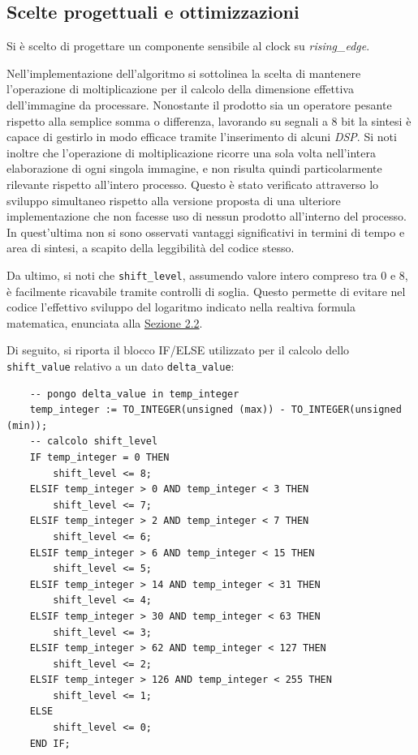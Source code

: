 \documentclass{article}
\begin{document}
\subsection{Scelte progettuali e ottimizzazioni} %
Si è scelto di progettare un componente sensibile al clock su \emph{rising\_edge}.\par
Nell’implementazione dell’algoritmo si sottolinea la scelta di mantenere l’operazione di moltiplicazione per il calcolo della dimensione effettiva dell’immagine da processare. Nonostante il prodotto sia un operatore pesante rispetto alla semplice somma o differenza, lavorando su segnali a 8 bit la sintesi è capace di gestirlo in modo efficace tramite l’inserimento di alcuni \emph{DSP}\footnotemark.
Si noti inoltre che l’operazione di moltiplicazione ricorre una sola volta nell’intera elaborazione di ogni singola immagine, e non risulta quindi particolarmente rilevante rispetto all’intero processo. Questo è stato verificato attraverso lo sviluppo simultaneo rispetto alla versione proposta di una ulteriore implementazione che non facesse uso di nessun prodotto all’interno del processo. In quest’ultima non si sono osservati vantaggi significativi in termini di tempo e area di sintesi, a scapito della leggibilità del codice stesso.\par
Da ultimo, si noti che \texttt{shift\_level}, assumendo valore intero compreso tra 0 e 8, è facilmente ricavabile tramite controlli di soglia. Questo permette di evitare nel codice l’effettivo sviluppo del logaritmo indicato nella realtiva formula matematica, enunciata alla \hyperref[sec:appr]{Sezione 2.2}.\par
Di seguito, si riporta il blocco IF/ELSE utilizzato per il calcolo dello \texttt{shift\_value} relativo a un dato \texttt{delta\_value}:

\begin{verbatim}
    -- pongo delta_value in temp_integer
    temp_integer := TO_INTEGER(unsigned (max)) - TO_INTEGER(unsigned (min)); 
    -- calcolo shift_level
    IF temp_integer = 0 THEN
        shift_level <= 8;
    ELSIF temp_integer > 0 AND temp_integer < 3 THEN
        shift_level <= 7;
    ELSIF temp_integer > 2 AND temp_integer < 7 THEN
        shift_level <= 6;
    ELSIF temp_integer > 6 AND temp_integer < 15 THEN
        shift_level <= 5;
    ELSIF temp_integer > 14 AND temp_integer < 31 THEN
        shift_level <= 4;
    ELSIF temp_integer > 30 AND temp_integer < 63 THEN
        shift_level <= 3;
    ELSIF temp_integer > 62 AND temp_integer < 127 THEN
        shift_level <= 2;
    ELSIF temp_integer > 126 AND temp_integer < 255 THEN
        shift_level <= 1;
    ELSE
        shift_level <= 0;
    END IF;
\end{verbatim}
\vspace{1cm}
\end{document}
